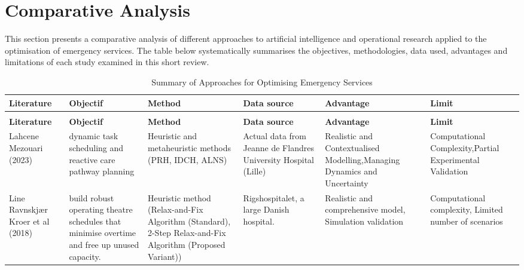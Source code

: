 \documentclass[runningheads]{llncs}
\begin{document}
\section{Comparative Analysis}
This section presents a comparative analysis of different approaches to artificial intelligence and operational research applied to the optimisation of emergency services. The table below systematically summarises the objectives, methodologies, data used, advantages and limitations of each study examined in this short review.
\begin{landscape}
\scriptsize
\begin{longtable}{|p{3cm}|p{3cm}|p{4cm}|p{3cm}|p{3cm}|p{3cm}|}
\caption{Summary of Approaches for Optimising Emergency Services} \\
\hline
\textbf{Literature} & \textbf{Objectif} & \textbf{Method} & \textbf{Data source} & \textbf{Advantage} & \textbf{Limit} \\ 
\endfirsthead
\caption{Summary of Approaches for Optimising Emergency Services} \\
\hline
\textbf{Literature} & \textbf{Objectif} & \textbf{Method} & \textbf{Data source} & \textbf{Advantage} & \textbf{Limit} \\ 
\endhead

\hline
\endfoot

\hline
\endlastfoot
\hline
\cite{mezouari2023thesis} Lahcene Mezouari (2023)  & dynamic task scheduling and reactive care pathway planning & Heuristic and metaheuristic methods (PRH, IDCH, ALNS) &Actual data from Jeanne de Flandres University Hospital (Lille)&Realistic and Contextualised Modelling,Managing Dynamics and Uncertainty &Computational Complexity,Partial Experimental Validation\\
\hline
\cite{kroer2018or} Line Ravnskjær Kroer et al (2018) & build robust operating theatre schedules that minimise overtime and free up unused capacity. & Heuristic method (Relax-and-Fix Algorithm (Standard), 2-Step Relax-and-Fix Algorithm (Proposed Variant)) &Rigshospitalet, a large Danish hospital.& Realistic and comprehensive model, Simulation validation & Computational complexity, Limited number of scenarios\\


\end{longtable}
\end{landscape}
\end{document}
